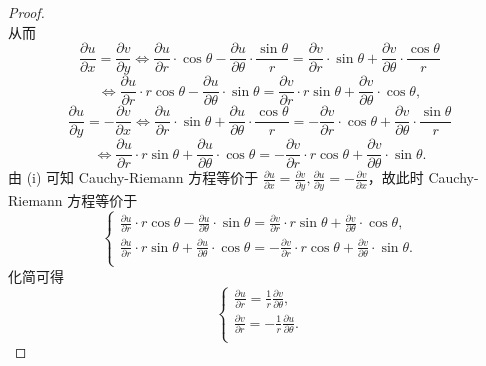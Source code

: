 \documentclass[../../main.tex]{subfiles}
\begin{document}
\begin{proof}
\[\]
从而
\[
\frac{\partial u}{\partial x} = \frac{\partial v}{\partial y} \Longleftrightarrow \frac{\partial u}{\partial r} \cdot \cos\theta - \frac{\partial u}{\partial \theta} \cdot \frac{\sin\theta}{r} = \frac{\partial v}{\partial r} \cdot \sin\theta + \frac{\partial v}{\partial \theta} \cdot \frac{\cos\theta}{r}
\]
\[
\Longleftrightarrow \frac{\partial u}{\partial r} \cdot r\cos\theta - \frac{\partial u}{\partial \theta} \cdot \sin\theta = \frac{\partial v}{\partial r} \cdot r\sin\theta + \frac{\partial v}{\partial \theta} \cdot \cos\theta,
\]
\[
\frac{\partial u}{\partial y} = -\frac{\partial v}{\partial x} \Longleftrightarrow \frac{\partial u}{\partial r} \cdot \sin\theta + \frac{\partial u}{\partial \theta} \cdot \frac{\cos\theta}{r} = -\frac{\partial v}{\partial r} \cdot \cos\theta + \frac{\partial v}{\partial \theta} \cdot \frac{\sin\theta}{r}
\]
\[
\Longleftrightarrow \frac{\partial u}{\partial r} \cdot r\sin\theta + \frac{\partial u}{\partial \theta} \cdot \cos\theta = -\frac{\partial v}{\partial r} \cdot r\cos\theta + \frac{\partial v}{\partial \theta} \cdot \sin\theta.
\]
由 (i) 可知 Cauchy-Riemann 方程等价于 \( \frac{\partial u}{\partial x} = \frac{\partial v}{\partial y}, \frac{\partial u}{\partial y} = -\frac{\partial v}{\partial x} \)，故此时 Cauchy-Riemann 方程等价于
\[
\begin{cases}
\frac{\partial u}{\partial r} \cdot r\cos\theta - \frac{\partial u}{\partial \theta} \cdot \sin\theta = \frac{\partial v}{\partial r} \cdot r\sin\theta + \frac{\partial v}{\partial \theta} \cdot \cos\theta, \\
\frac{\partial u}{\partial r} \cdot r\sin\theta + \frac{\partial u}{\partial \theta} \cdot \cos\theta = -\frac{\partial v}{\partial r} \cdot r\cos\theta + \frac{\partial v}{\partial \theta} \cdot \sin\theta. \\
\end{cases}
\]
化简可得
\[
\begin{cases}
\frac{\partial u}{\partial r} = \frac{1}{r}\frac{\partial v}{\partial \theta}, \\
\frac{\partial v}{\partial r} = -\frac{1}{r}\frac{\partial u}{\partial \theta}. \\
\end{cases}
\]

\end{proof}
\end{document}

